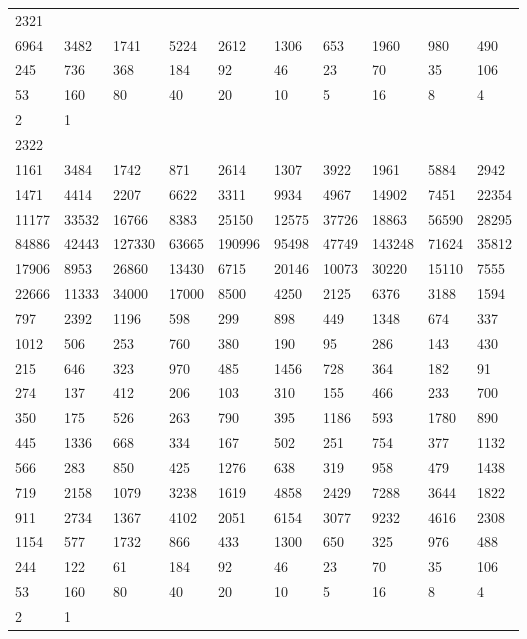 \begin{longtable}{*{10}{l}}
2321&&&&&&&&&\\
6964& 3482& 1741& 5224& 2612& 1306& 653& 1960& 980& 490\\
245& 736& 368& 184& 92& 46& 23& 70& 35& 106\\
53& 160& 80& 40& 20& 10& 5& 16& 8& 4\\
2& 1& \\

2322&&&&&&&&&\\
1161& 3484& 1742& 871& 2614& 1307& 3922& 1961& 5884& 2942\\
1471& 4414& 2207& 6622& 3311& 9934& 4967& 14902& 7451& 22354\\
11177& 33532& 16766& 8383& 25150& 12575& 37726& 18863& 56590& 28295\\
84886& 42443& 127330& 63665& 190996& 95498& 47749& 143248& 71624& 35812\\
17906& 8953& 26860& 13430& 6715& 20146& 10073& 30220& 15110& 7555\\
22666& 11333& 34000& 17000& 8500& 4250& 2125& 6376& 3188& 1594\\
797& 2392& 1196& 598& 299& 898& 449& 1348& 674& 337\\
1012& 506& 253& 760& 380& 190& 95& 286& 143& 430\\
215& 646& 323& 970& 485& 1456& 728& 364& 182& 91\\
274& 137& 412& 206& 103& 310& 155& 466& 233& 700\\
350& 175& 526& 263& 790& 395& 1186& 593& 1780& 890\\
445& 1336& 668& 334& 167& 502& 251& 754& 377& 1132\\
566& 283& 850& 425& 1276& 638& 319& 958& 479& 1438\\
719& 2158& 1079& 3238& 1619& 4858& 2429& 7288& 3644& 1822\\
911& 2734& 1367& 4102& 2051& 6154& 3077& 9232& 4616& 2308\\
1154& 577& 1732& 866& 433& 1300& 650& 325& 976& 488\\
244& 122& 61& 184& 92& 46& 23& 70& 35& 106\\
53& 160& 80& 40& 20& 10& 5& 16& 8& 4\\
2& 1& \\


\end{longtable}
